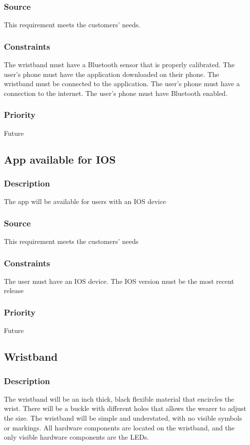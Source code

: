 \subsubsection{Source}
This requirement meets the customers' needs.
\subsubsection{Constraints}
The wristband must have a Bluetooth sensor that is properly calibrated. The user's phone must have the application downloaded on their phone. The wristband must be connected to the application. The user's phone must have a connection to the internet. The user's phone must have Bluetooth enabled. 
\subsubsection{Priority}
Future

\subsection{App available for IOS}
\subsubsection{Description}
The app will be available for users with an IOS device
\subsubsection{Source}
This requirement meets the customers' needs
\subsubsection{Constraints}
The user must have an IOS device. The IOS version must be the most recent release 
\subsubsection{Priority}
Future

\subsection{Wristband}
\subsubsection{Description}
The wristband will be an inch thick, black flexible material that encircles the wrist. There will be a buckle with different holes that allows the wearer to adjust the size. The wristband will be simple and understated, with no visible symbols or markings. All hardware components are located on the wristband, and the only visible hardware components are the LEDs.
